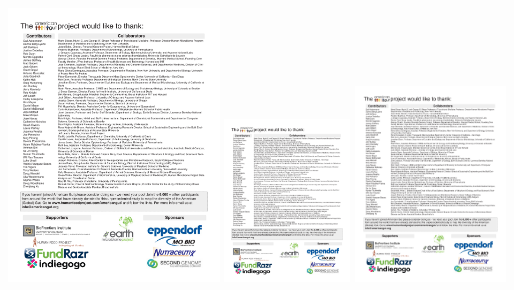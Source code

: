\documentclass[10pt,letterpaper]{article}
\begin{document}
\includegraphics[width=0.42\textwidth]{pdfs-mod1/s1.pdf}
\includegraphics[width=0.25\textwidth]{pdfs-mod1/s2.pdf}
\includegraphics[width=0.3\textwidth]{pdfs-mod1/s3.pdf}
\end{document}
